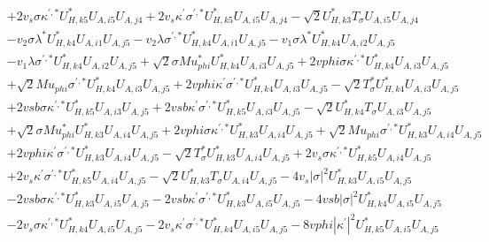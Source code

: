 \begin{align}
 &+2 v_s \sigma \kappa^{\prime,*} U^*_{{H},{k 5}} U_{A,{i 5}} U_{A,{j 4}} +2 v_s \kappa^\prime \sigma^{\prime,*} U^*_{{H},{k 5}} U_{A,{i 5}} U_{A,{j 4}} - \sqrt{2} U^*_{{H},{k 3}} T_{\sigma} U_{A,{i 5}} U_{A,{j 4}} \nonumber \\ 
 &- v_2 \sigma \lambda^* U^*_{{H},{k 4}} U_{A,{i 1}} U_{A,{j 5}} - v_2 \lambda \sigma^{\prime,*} U^*_{{H},{k 4}} U_{A,{i 1}} U_{A,{j 5}} - v_1 \sigma \lambda^* U^*_{{H},{k 4}} U_{A,{i 2}} U_{A,{j 5}} \nonumber \\ 
 &- v_1 \lambda \sigma^{\prime,*} U^*_{{H},{k 4}} U_{A,{i 2}} U_{A,{j 5}} +\sqrt{2} \sigma Mu_{phi}^* U^*_{{H},{k 4}} U_{A,{i 3}} U_{A,{j 5}} +2 vphi \sigma \kappa^{\prime,*} U^*_{{H},{k 4}} U_{A,{i 3}} U_{A,{j 5}} \nonumber \\ 
 &+\sqrt{2} Mu_{phi} \sigma^{\prime,*} U^*_{{H},{k 4}} U_{A,{i 3}} U_{A,{j 5}} +2 vphi \kappa^\prime \sigma^{\prime,*} U^*_{{H},{k 4}} U_{A,{i 3}} U_{A,{j 5}} - \sqrt{2} T_{\sigma}^* U^*_{{H},{k 4}} U_{A,{i 3}} U_{A,{j 5}} \nonumber \\ 
 &+2 vsb \sigma \kappa^{\prime,*} U^*_{{H},{k 5}} U_{A,{i 3}} U_{A,{j 5}} +2 vsb \kappa^\prime \sigma^{\prime,*} U^*_{{H},{k 5}} U_{A,{i 3}} U_{A,{j 5}} - \sqrt{2} U^*_{{H},{k 4}} T_{\sigma} U_{A,{i 3}} U_{A,{j 5}} \nonumber \\ 
 &+\sqrt{2} \sigma Mu_{phi}^* U^*_{{H},{k 3}} U_{A,{i 4}} U_{A,{j 5}} +2 vphi \sigma \kappa^{\prime,*} U^*_{{H},{k 3}} U_{A,{i 4}} U_{A,{j 5}} +\sqrt{2} Mu_{phi} \sigma^{\prime,*} U^*_{{H},{k 3}} U_{A,{i 4}} U_{A,{j 5}} \nonumber \\ 
 &+2 vphi \kappa^\prime \sigma^{\prime,*} U^*_{{H},{k 3}} U_{A,{i 4}} U_{A,{j 5}} - \sqrt{2} T_{\sigma}^* U^*_{{H},{k 3}} U_{A,{i 4}} U_{A,{j 5}} +2 v_s \sigma \kappa^{\prime,*} U^*_{{H},{k 5}} U_{A,{i 4}} U_{A,{j 5}} \nonumber \\ 
 &+2 v_s \kappa^\prime \sigma^{\prime,*} U^*_{{H},{k 5}} U_{A,{i 4}} U_{A,{j 5}} - \sqrt{2} U^*_{{H},{k 3}} T_{\sigma} U_{A,{i 4}} U_{A,{j 5}} -4 v_s |\sigma|^2 U^*_{{H},{k 3}} U_{A,{i 5}} U_{A,{j 5}} \nonumber \\ 
 &-2 vsb \sigma \kappa^{\prime,*} U^*_{{H},{k 3}} U_{A,{i 5}} U_{A,{j 5}} -2 vsb \kappa^\prime \sigma^{\prime,*} U^*_{{H},{k 3}} U_{A,{i 5}} U_{A,{j 5}} -4 vsb |\sigma|^2 U^*_{{H},{k 4}} U_{A,{i 5}} U_{A,{j 5}} \nonumber \\ 
 &-2 v_s \sigma \kappa^{\prime,*} U^*_{{H},{k 4}} U_{A,{i 5}} U_{A,{j 5}} -2 v_s \kappa^\prime \sigma^{\prime,*} U^*_{{H},{k 4}} U_{A,{i 5}} U_{A,{j 5}} -8 vphi |\kappa^\prime|^2 U^*_{{H},{k 5}} U_{A,{i 5}} U_{A,{j 5}} \nonumber \\ 

\end{align}
